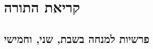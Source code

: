 \chapter[קריאת התורה]{ קריאת התורה }
\label{torah}

\section{פרשיות למנחה בשבת, שני, וחמישי}

\begin{footnotesize}

\\

\\

\\

\\

\\

\\


\end{footnotesize}
